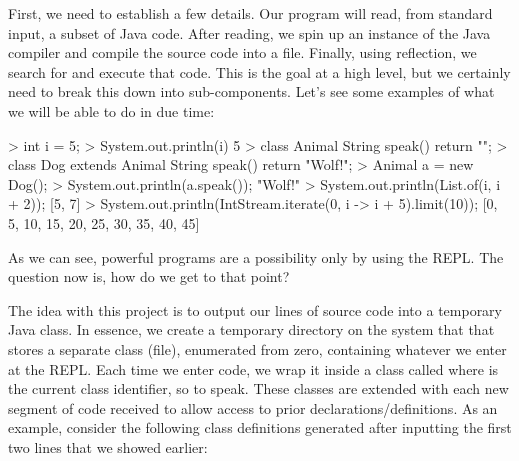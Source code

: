 
First, we need to establish a few details. Our program will read, from standard input, a subset of Java code. After reading, we spin up an instance of the Java compiler and compile the source code into a  file. Finally, using reflection, we search for and execute that code. This is the goal at a high level, but we certainly need to break this down into sub-components. Let's see some examples of what we will be able to do in due time:

\begin{verbnobox}[\small]
> int i = 5;
> System.out.println(i)
5
> class Animal { String speak() { return ""; }}
> class Dog extends Animal { String speak() { return "Wolf!"; }}
> Animal a = new Dog();
> System.out.println(a.speak());
"Wolf!"
> System.out.println(List.of(i, i + 2));
[5, 7]
> System.out.println(IntStream.iterate(0, i -> i + 5).limit(10));
[0, 5, 10, 15, 20, 25, 30, 35, 40, 45]
\end{verbnobox}

As we can see, powerful programs are a possibility only by using the REPL. The question now is, how do we get to that point?

The idea with this project is to output our lines of source code into a temporary Java class. In essence, we create a temporary directory on the system that that stores a separate class (file), enumerated from zero, containing whatever we enter at the REPL. Each time we enter code, we wrap it inside a class called  where  is the current class identifier, so to speak. These classes are extended with each new segment of code received to allow access to prior declarations/definitions. As an example, consider the following class definitions generated after inputting the first two lines that we showed earlier:

